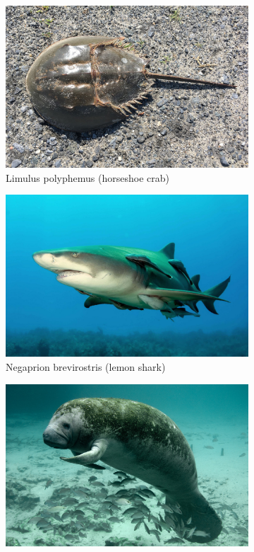 \documentclass[10pt]{article}
\begin{document}
\begin{figure}[h]
\begin{subfigure}[b]{0.48\textwidth}
         \includegraphics[width=\textwidth]{images/limulus_polyphemus.jpg}
         \caption{Limulus polyphemus (horseshoe crab)}
     \end{subfigure}
     \hfill
     \begin{subfigure}[b]{0.48\textwidth}
         \centering
         \includegraphics[width=\textwidth]{images/negaprion_brevirostris.jpg}
         \caption{Negaprion brevirostris (lemon shark)}
     \end{subfigure}
     \hfill
     \begin{subfigure}[b]{0.48\textwidth}
         \centering
         \includegraphics[width=\textwidth]{images/trichechus_manatus.jpg}

\end{subfigure}
\end{figure}
\end{document}
